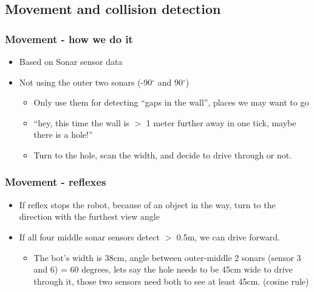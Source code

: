 \documentclass{beamer}
\begin{document}
\subsection{Movement and collision detection}
\begin{frame}
\frametitle{Movement - how we do it}
\begin{itemize}
    \item Based on Sonar sensor data
    \item Not using the outer two sonars (-90$^{\circ}$ and 90$^{\circ}$)
    \begin{itemize}
        \item Only use them for detecting ``gaps in the wall'', places we may
        want to go
        \item ``hey, this time the wall is $>$ 1 meter further away in one tick, maybe there is a hole!''
        \item  Turn to the hole, scan the width, and decide to drive through or not.
    \end{itemize}
\end{itemize}
\end{frame}

\begin{frame}
    \frametitle{Movement - reflexes}
    \begin{itemize}
        \item If reflex stops the robot, because of an object in the way, turn
        to the direction with the furthest view angle
        \item If all four middle sonar sensors detect $>$ 0.5m, we can drive
        forward.
        \begin{itemize}
            \item The bot's width is 38cm, angle between outer-middle 2 sonars (sensor 3 and 6) = 60 degrees, lets say the hole needs to be 45cm wide to drive through it, those two sensors need both to see at least 45cm. (cosine rule)
        \end{itemize}
    \end{itemize}
\end{frame}
\end{document}
